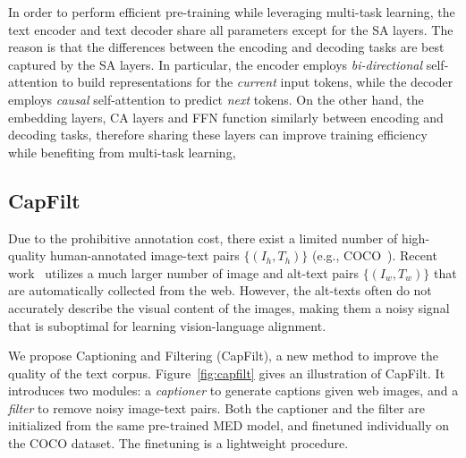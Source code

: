 In order to perform efficient pre-training while leveraging multi-task learning,
the text encoder and text decoder share all parameters except for the SA layers.
The reason is that the differences between the encoding and decoding tasks are best captured by the SA layers. In particular, the encoder employs \textit{bi-directional} self-attention to build representations for the \textit{current} input tokens, while the decoder employs \textit{causal} self-attention to predict \textit{next} tokens.
On the other hand, the embedding layers, CA layers and FFN function similarly between encoding and decoding tasks,
therefore sharing these layers can improve training efficiency while benefiting from multi-task learning,





\vspace{-0.5ex}
\subsection{CapFilt}
\vspace{-0.5ex}
Due to the prohibitive annotation cost,
there exist a limited number of high-quality human-annotated image-text pairs $\{(I_h,T_h)\}$ (e.g., COCO~\cite{coco}).
Recent work~\cite{ALBEF,simvlm} utilizes a much larger number of image and alt-text pairs $\{(I_w,T_w)\}$ that are automatically collected from the web.
However, the alt-texts often do not accurately describe the visual content of the images, making them a noisy signal that is suboptimal for learning vision-language alignment. 

We propose Captioning and Filtering (CapFilt),
a new method to improve the quality of the text corpus.
Figure~\ref{fig:capfilt} gives an illustration of CapFilt. 
It introduces two modules: a \textit{captioner} to generate captions given web images,
and a \textit{filter} to remove noisy image-text pairs.
Both the captioner and the filter are initialized from the same pre-trained MED model,
and finetuned individually on the COCO dataset.
The finetuning is a lightweight procedure.

